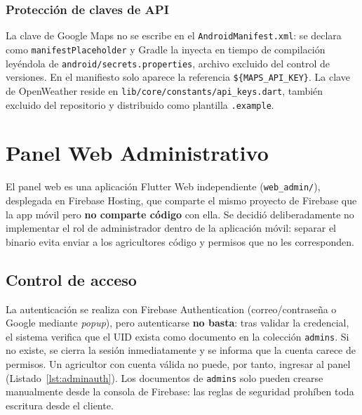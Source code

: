 \documentclass[12pt,a4paper]{article}
\begin{document}
\subsubsection{Protección de claves de API}

La clave de Google Maps no se escribe en el \texttt{AndroidManifest.xml}: se
declara como \texttt{manifestPlaceholder} y Gradle la inyecta en tiempo de
compilación leyéndola de \texttt{android/secrets.properties}, archivo excluido
del control de versiones. En el manifiesto solo aparece la referencia
\texttt{\$\{MAPS\_API\_KEY\}}. La clave de OpenWeather reside en
\texttt{lib/core/constants/api\_keys.dart}, también excluido del repositorio y
distribuido como plantilla \texttt{.example}.

\section{Panel Web Administrativo}

El panel web es una aplicación Flutter Web independiente
(\texttt{web\_admin/}), desplegada en Firebase Hosting, que comparte el mismo
proyecto de Firebase que la app móvil pero \textbf{no comparte código} con ella.
Se decidió deliberadamente no implementar el rol de administrador dentro de la
aplicación móvil: separar el binario evita enviar a los agricultores código y
permisos que no les corresponden.

\subsection{Control de acceso}

La autenticación se realiza con Firebase Authentication (correo/contraseña o
Google mediante \textit{popup}), pero autenticarse \textbf{no basta}: tras
validar la credencial, el sistema verifica que el UID exista como documento en
la colección \texttt{admins}. Si no existe, se cierra la sesión inmediatamente y
se informa que la cuenta carece de permisos. Un agricultor con cuenta válida no
puede, por tanto, ingresar al panel (Listado~\ref{lst:adminauth}). Los documentos
de \texttt{admins} solo pueden crearse manualmente desde la consola de Firebase:
las reglas de seguridad prohíben toda escritura desde el cliente.
\end{document}
